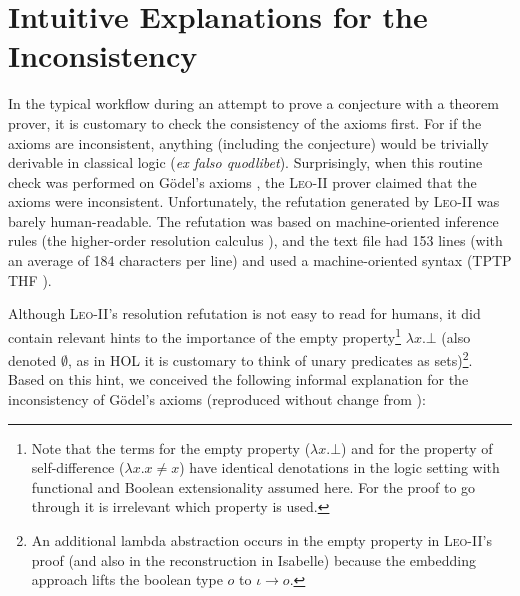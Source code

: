 \documentclass{llncs}
\newcommand{\imp}{{\rightarrow}}
\begin{document}
\section{Intuitive Explanations for the Inconsistency} 
\label{sec:inconsistency}

In the typical workflow during an attempt to prove a conjecture with a
theorem prover, it is customary to check the consistency of the axioms
first. For if the axioms are inconsistent, anything (including the
conjecture) would be trivially derivable in classical logic (\emph{ex
  falso quodlibet}). Surprisingly, when this routine check was
performed on G\"odel's axioms \cite{C40}, the \textsc{Leo-II} prover
claimed that the axioms were inconsistent. Unfortunately, the
refutation generated by \textsc{Leo-II} was barely human-readable. The refutation was based on machine-oriented inference rules (the higher-order resolution calculus \cite{W47}), and the
text file had 153 lines (with an average of 184
  characters per line) and used a machine-oriented syntax (TPTP THF
\cite{J22}). 


Although \textsc{Leo-II}'s resolution refutation is not easy to read
for humans, it did contain relevant hints to the importance of the
empty property\footnote{
  Note that the terms for the empty property ($\lambda x. \bot$) and for the property of self-difference ($\lambda x.  x\not=x$) have identical denotations in the logic setting
  with functional and Boolean extensionality assumed
  here. 
  For the proof to go through it is
  irrelevant which property is used.
} $\lambda x. \bot$ (also denoted $\emptyset$, as in HOL it is customary to think of unary predicates as sets)\footnote{An additional lambda abstraction occurs in the empty property in \textsc{Leo-II}'s proof (and also in the reconstruction in Isabelle) because the embedding approach lifts the boolean type $o$ to $\iota \imp o$.}. Based on this hint, we conceived the following informal explanation for the inconsistency of G\"odel's axioms (reproduced without change from \cite{C55}):
%
\end{document}
